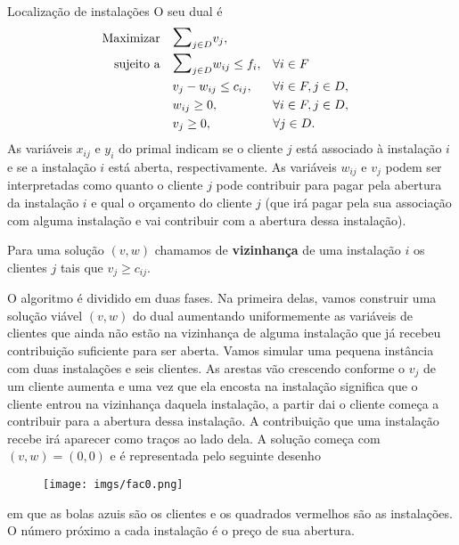 \documentclass[final]{beamer}
\renewcommand{\emph}[1]{\textbf{#1}}
\begin{document}
\begin{frame}[t]
\begin{columns}[t]
\begin{column}{0.47\paperwidth}
\begin{block}{Localização de instalações}
      O seu dual é 
      \begin{subequations}
        \begin{align}
          \text{Maximizar} \quad & \scalebox{1.5}{$\sum$}_{j \in D} v_{j},\\
          \text{sujeito a} \quad & \scalebox{1.5}{$\sum$}_{j\in D} w_{ij}\leq f_i, && \forall i \in F\\
          &v_{j} - w_{ij}\leq c_{ij}, && \forall i\in F,j\in D,\\
          &w_{ij} \geq 0 , && \forall i\in F,j\in D,\\
          &v_j \geq 0, && \forall j\in D.
        \end{align}
      \end{subequations}
      As variáveis $x_{ij}$ e $y_i$ do primal indicam se o cliente $j$ está associado à instalação $i$ e se a instalação $i$ está aberta, respectivamente. As variáveis $w_{ij}$ e $v_j$ podem ser interpretadas como quanto o cliente $j$ pode contribuir para pagar pela abertura da instalação $i$ e qual o orçamento do cliente $j$ (que irá pagar pela sua associação com alguma instalação e vai contribuir com a abertura dessa instalação).

      Para uma solução $(v,w)$ chamamos de \emph{vizinhança} de uma instalação $i$ os clientes $j$ tais que $v_j \geq c_{ij}$. 
      
      O algoritmo é dividido em duas fases. Na primeira delas, vamos construir uma solução viável $(v,w)$ do dual aumentando uniformemente as variáveis de clientes que ainda não estão na vizinhança de alguma instalação que já recebeu contribuição suficiente para ser aberta. Vamos simular uma pequena instância com duas instalações e seis clientes. As arestas vão crescendo conforme o $v_j$ de um cliente aumenta e uma vez que ela encosta na instalação significa que o cliente entrou na vizinhança daquela instalação, a partir dai o cliente começa a contribuir para a abertura dessa instalação. A contribuição que uma instalação recebe irá aparecer como traços ao lado dela. A solução começa com $(v,w) = (0,0)$ e é representada pelo seguinte desenho
      \begin{figure}
        \texttt{[image: imgs/fac0.png]}
      \end{figure}
      em que as bolas azuis são os clientes e os quadrados vermelhos são as instalações. O número próximo a cada instalação é o preço de sua abertura.
      

\end{block}
\end{column}
\end{columns}
\end{frame}
\end{document}
